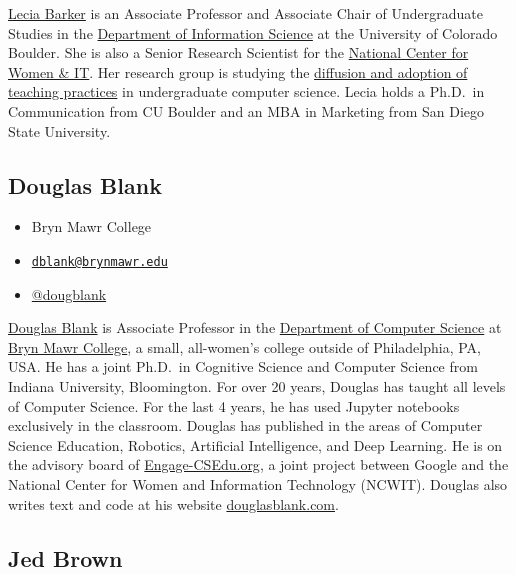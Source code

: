 \documentclass[]{book}
\providecommand{\tightlist}{%
  \setlength{\itemsep}{0pt}\setlength{\parskip}{0pt}}
\begin{document}
\href{https://www.colorado.edu/cmci/people/information-science/lecia-barker}{Lecia Barker}
is an Associate Professor and Associate Chair of Undergraduate Studies
in the \href{https://www.colorado.edu/cmci/infoscience}{Department of Information Science}
at the University of Colorado Boulder. She is also a Senior Research Scientist for
the \href{https://www.ncwit.org/}{National Center for Women \& IT}.
Her research group is studying the
\href{https://csteachingpractices.wordpress.com/}{diffusion and adoption of teaching practices}
in undergraduate computer science. Lecia holds a Ph.D.~in Communication from CU Boulder
and an MBA in Marketing from San Diego State University.

\hypertarget{douglas-blank}{%
\subsection*{Douglas Blank}\label{douglas-blank}}

\begin{itemize}
\tightlist
\item
  Bryn Mawr College
\item
  \href{mailto:dblank@brynmawr.edu}{\nolinkurl{dblank@brynmawr.edu}}
\item
  \href{https://twitter.com/dougblank}{@dougblank}
\end{itemize}

\href{https://cs.brynmawr.edu/~dblank/}{Douglas Blank} is Associate Professor in the
\href{https://cs.brynmawr.edu/}{Department of Computer Science} at
\href{http://brynmawr.edu/}{Bryn Mawr College}, a small, all-women's college outside
of Philadelphia, PA, USA. He has a joint Ph.D.~in Cognitive Science and Computer
Science from Indiana University, Bloomington. For over 20 years, Douglas has taught
all levels of Computer Science. For the last 4 years, he has used Jupyter notebooks
exclusively in the classroom. Douglas has published in the areas of Computer Science
Education, Robotics, Artificial Intelligence, and Deep Learning. He is on the advisory
board of \href{https://www.engage-csedu.org}{Engage-CSEdu.org}, a joint project between
Google and the National Center for Women and Information Technology (NCWIT).
Douglas also writes text and code at his website \href{http://douglasblank.com}{douglasblank.com}.

\hypertarget{jed-brown}{%
\subsection*{Jed Brown}\label{jed-brown}}
\end{document}
